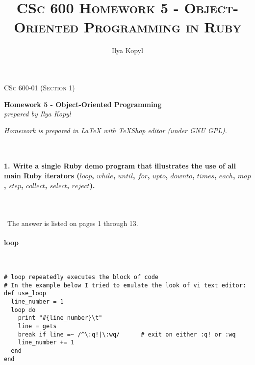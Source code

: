 \documentclass{article}
\author{Ilya Kopyl}
\begin{document}
	\setlength{\grammarparsep}{5pt plus 1pt minus 1pt} %
	\setlength{\grammarindent}{13em} %




	\begin{titlepage}
		\begin{center}
				\Large\textsc{CSc 600-01 (Section 1)}
				
				\Large\textbf{Homework 5 - Object-Oriented Programming}\\

				\Large\textit{prepared by Ilya Kopyl}
				
		\end{center}	
	\end{titlepage}


	\title{\textsc{CSc 600 Homework 5 - Object-Oriented Programming in Ruby}}	
	\maketitle
	
		\noindent \textit{Homework is prepared in LaTeX with TeXShop editor (under GNU GPL).}

	\rmfamily\




	\paragraph{1. Write a single Ruby demo program that illustrates the use of all main Ruby iterators (\(loop\), \(while\), \(until\), \(for\), \(upto\), \(downto\), \(times\), \(each\), \(map\), \(step\), \(collect\), \(select\), \(reject\)).}\
	
	\paragraph{}\
The answer is listed on pages 1 through 13.

\paragraph{ loop}\

\begin{verbatim}
# loop repeatedly executes the block of code
# In the example below I tried to emulate the look of vi text editor:
def use_loop
  line_number = 1
  loop do
    print "#{line_number}\t"
    line = gets
    break if line =~ /^\:q!|\:wq/      # exit on either :q! or :wq
    line_number += 1
  end
end
\end{verbatim}
\end{document}
